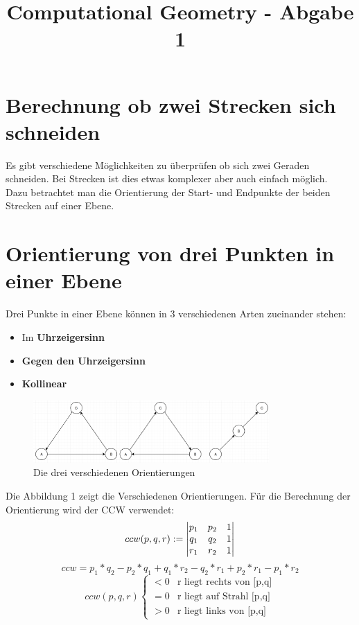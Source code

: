 \documentclass[conference]{IEEEtran}
\begin{document}
\title{Computational Geometry - Abgabe 1}

\author{
}

\maketitle


\section{Berechnung ob zwei Strecken sich schneiden}
Es gibt verschiedene Möglichkeiten zu überprüfen ob sich zwei Geraden schneiden. Bei Strecken ist dies etwas komplexer aber auch einfach möglich.\\
Dazu betrachtet man die Orientierung der Start- und Endpunkte der beiden Strecken auf einer Ebene. 
\section{Orientierung von drei Punkten in einer Ebene}
Drei Punkte in einer Ebene können in 3 verschiedenen Arten zueinander stehen:
\begin{itemize}
	\item Im \textbf{Uhrzeigersinn}
	\item \textbf{Gegen den Uhrzeigersinn}
	\item \textbf{Kollinear}
\end{itemize}
\begin{figure}[h]
	\begin{center}
		\includegraphics[width=9cm]{Orientation.png}
		\caption{Die drei verschiedenen Orientierungen}
		\label{figure_3}
	\end{center}
\end{figure}
Die Abbildung 1 zeigt die Verschiedenen Orientierungen. Für die Berechnung der Orientierung wird der CCW verwendet:
\[ 
ccw(p,q,r) := 
\begin{vmatrix}
	p_1 & p_2 & 1 \\ 
	q_1 & q_2 & 1 \\ 
	r_1 & r_2 & 1 \notag
\end{vmatrix} \]
\[ ccw = p_1*q_2 - p_2*q_1 + q_1*r_2 - q_2*r_1 + p_2*r_1 - p_1*r_2\]
\[ ccw(p,q,r) \begin{cases} < 0 &\text{r liegt rechts von [p,q]}\\ = 0 &\text{r liegt auf Strahl [p,q]}\\ > 0 &\text{r liegt links von [p,q]}\end{cases} \]
\end{document}
